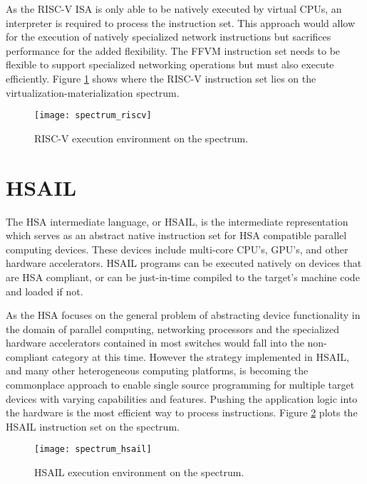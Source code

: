 As the RISC-V ISA is only able to be natively executed by virtual CPUs, an
interpreter is required to process the instruction set. This approach would
allow for the execution of natively specialized network instructions but
sacrifices performance for the added flexibility. The FFVM instruction set
needs to be flexible to support specialized networking operations but must also
execute efficiently. Figure \ref{spectrum_riscv} shows where the RISC-V
instruction set lies on the virtualization-materialization spectrum.

\begin{figure}[h!]
  \centering
  \texttt{[image: spectrum\_riscv]}
  \caption{RISC-V execution environment on the spectrum.}
  \label{spectrum_riscv}
\end{figure}

\section{HSAIL}
\label{insn:hsail}
The HSA intermediate language, or HSAIL, is the intermediate representation
which serves as an abstract native instruction set for HSA compatible parallel
computing devices. These devices include multi-core CPU's, GPU's, and other
hardware accelerators. HSAIL programs can be executed natively on devices that
are HSA compliant, or can be just-in-time compiled to the target's machine code
and loaded if not.

As the HSA focuses on the general problem of abstracting device functionality
in the domain of parallel computing, networking processors and the specialized
hardware accelerators contained in most switches would fall into the
non-compliant category at this time. However the strategy implemented in HSAIL,
and many other heterogeneous computing platforms, is becoming the commonplace
approach to enable single source programming for multiple target devices with
varying capabilities and features. Pushing the application logic into the
hardware is the most efficient way to process instructions. Figure
\ref{spectrum_hsail} plots the HSAIL instruction set on the spectrum.

\begin{figure}[h!]
  \centering
  \texttt{[image: spectrum\_hsail]}
  \caption{HSAIL execution environment on the spectrum.}
  \label{spectrum_hsail}
\end{figure}


